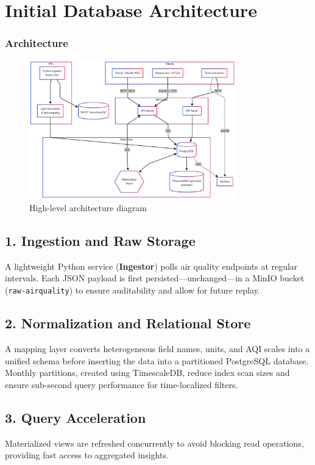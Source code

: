 \section{Initial Database Architecture}

\subsubsection*{Architecture}

\begin{figure}[H]
  \centering
  \includegraphics[width=0.8\textwidth]{Imagenes/Arquitectura.png}
  \caption{High-level architecture diagram}
\end{figure}

\subsection*{1. Ingestion and Raw Storage}
A lightweight Python service (\textbf{Ingestor}) polls air quality endpoints at regular intervals. Each JSON payload is first persisted—unchanged—in a MinIO bucket (\texttt{raw-airquality}) to ensure auditability and allow for future replay.

\subsection*{2. Normalization and Relational Store}
A mapping layer converts heterogeneous field names, units, and AQI scales into a unified schema before inserting the data into a partitioned PostgreSQL database. Monthly partitions, created using TimescaleDB, reduce index scan sizes and ensure sub-second query performance for time-localized filters.

\subsection*{3. Query Acceleration}
Materialized views are refreshed concurrently to avoid blocking read operations, providing fast access to aggregated insights.

